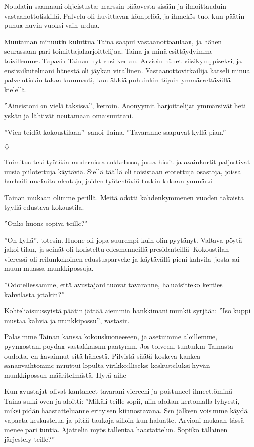 ﻿\documentclass[a4paper, 12pt, finnish]{article}
\newcommand{\q}[1]{''#1''}
\def\jump{\vspace{2mm} \centerline{$\diamondsuit$} \vspace{2mm}}
\begin{document}
Noudatin saamaani ohjeistusta: marssin pääovesta sisään ja
ilmoittauduin vastaanottotiskillä. Palvelu oli huvittavan kömpelöä,
ja ihmekös tuo, kun päätin puhua huvin vuoksi
vain urdua.

Muutaman minuutin kuluttua Taina saapui vastaanottoaulaan,
ja hänen seurassaan pari toimittajaharjoittelijaa.
Taina ja minä esittäydyimme toisillemme. Tapasin Tainan nyt ensi kerran. Arvioin hänet viisikymppiseksi, ja ensivaikutelmani hänestä oli jäykän virallinen.
Vastaanottovirkailija katseli minua palvelutiskin takaa kummasti,
kun äkkiä puhuinkin täysin ymmärrettävällä kielellä.

\q{Aineistoni on vielä taksissa}, kerroin. Anonyymit harjoittelijat 
ymmärsivät heti yskän ja lähtivät noutamaan omaisuuttani.

\q{Vien teidät kokoustilaan}, sanoi Taina. \q{Tavaranne saapuvat kyllä pian.}


\jump


Toimitus teki työtään modernissa sokkelossa, jossa hissit ja
avainkortit paljastivat uusia piilotettuja käytäviä. Siellä täällä
oli toisistaan erotettuja osastoja, joissa harhaili uneliaita
olentoja, joiden työtehtäviä tuskin kukaan ymmärsi.

Tainan mukaan olimme perillä. Meitä odotti kahdenkymmenen vuoden
takaista tyyliä edustava kokoustila.

\q{Onko huone sopiva teille?}

\q{On kyllä}, totesin. Huone oli jopa suurempi kuin olin pyytänyt.
Valtava pöytä jakoi tilan, ja seinät oli koristeltu edesmenneillä
presidenteillä. Kokoustilan vieressä oli reilunkokoinen
edustusparveke ja käytävällä pieni kahvila, josta sai muun
muassa munkkipossuja.

\q{Odotellessamme, että avustajani tuovat tavaranne,
haluaisitteko kenties kahvilasta jotakin?}

Kohteliaisuussyistä päätin
jättää aiemmin hankkimani munkit syrjään: \q{Iso kuppi mustaa kahvia
ja munkkipossu}, vastasin.

Palasimme Tainan kanssa kokoushuoneeseen, ja asetuimme aloillemme,
pyynnöstäni pöydän vastakkaisiin päätyihin.
Jos toiveeni tuntuikin Tainasta oudolta, en havainnut sitä hänestä.
Pilvistä säätä koskeva kankea sananvaihtomme muuttui lopulta
virikkeelliseksi keskusteluksi hyvän munkkipossun määritelmästä.
Hyvä aihe.

Kun avustajat olivat kantaneet tavarani viereeni ja poistuneet
ilmeettöminä, Taina sulki oven ja aloitti:
\q{Mikäli teille sopii, niin aloitan kertomalla lyhyesti,
miksi pidän haastatteluanne erityisen kiinnostavana. Sen jälkeen
voisimme käydä vapaata keskustelua ja pitää taukoja silloin kun haluatte.
Arvioni mukaan tässä menee pari tuntia. Ajattelin myös tallentaa
haastattelun. Sopiiko tällainen järjestely teille?}
\end{document}
